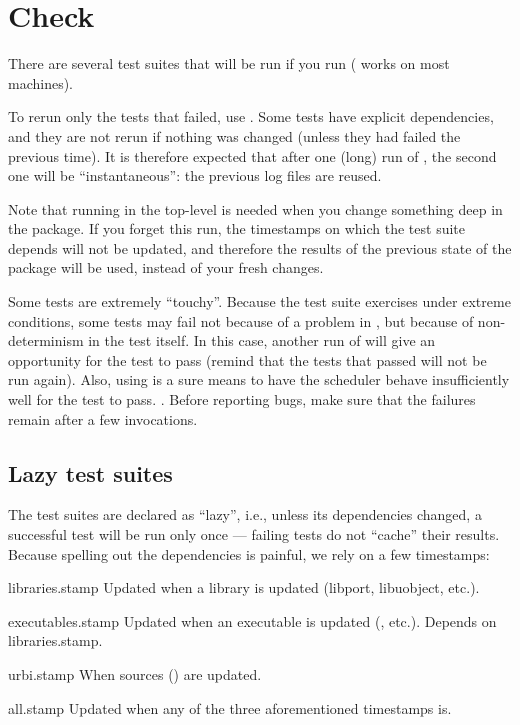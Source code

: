 \section{Check}
\label{sec:build:check}
There are several test suites that will be run if you run  ( works on most machines).

To rerun only the tests that failed, use .  Some tests
have explicit dependencies, and they are not rerun if nothing was changed
(unless they had failed the previous time).  It is therefore expected that
after one (long) run of , the second one will be
``instantaneous'': the previous log files are reused.

Note that running  in the top-level is needed when you change
something deep in the package.  If you forget this  run, the
timestamps on which the test suite depends will not be updated, and
therefore the results of the previous state of the package will be used,
instead of your fresh changes.

Some tests are extremely ``touchy''.  Because the test suite exercises \urbi
under extreme conditions, some tests may fail not because of a problem in
\urbi, but because of non-determinism in the test itself.  In this case,
another run of  will give an opportunity for the test to
pass (remind that the tests that passed will not be run again).  Also, using
 is a sure means to have the \urbi scheduler behave
insufficiently well for the test to pass.  .  Before reporting bugs, make sure that the failures
remain after a few  invocations.


\subsection{Lazy test suites}
The test suites are declared as ``lazy'', i.e., unless its
dependencies changed, a successful test will be run only once ---
failing tests do not ``cache'' their results.  Because spelling out
the dependencies is painful, we rely on a few timestamps:

\begin{files}
\item[libraries.stamp] Updated when a library is updated (libport,
  libuobject, etc.).

\item[executables.stamp] Updated when an executable is updated
  (, etc.).  Depends on libraries.stamp.

\item[urbi.stamp] When \urbi sources () are updated.

\item[all.stamp] Updated when any of the three aforementioned
  timestamps is.
\end{files}

